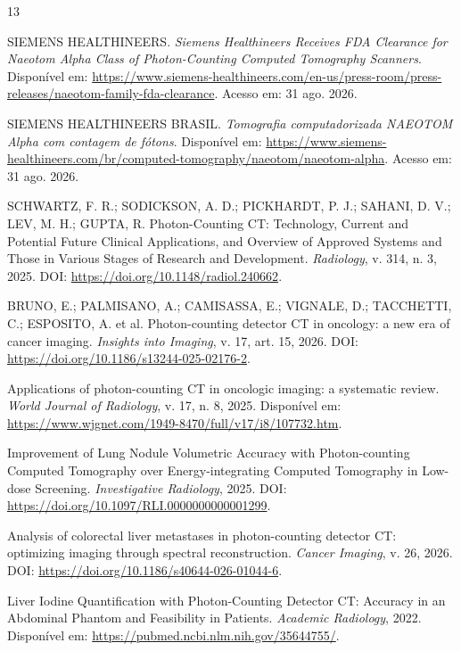 \documentclass[11pt,a4paper]{article}
\begin{document}
\begin{thebibliography}{13}

 SIEMENS HEALTHINEERS. \emph{Siemens Healthineers Receives FDA Clearance for Naeotom Alpha Class of Photon-Counting Computed Tomography Scanners}. Disponível em: \url{https://www.siemens-healthineers.com/en-us/press-room/press-releases/naeotom-family-fda-clearance}. Acesso em: 31 ago. 2026.

 SIEMENS HEALTHINEERS BRASIL. \emph{Tomografia computadorizada NAEOTOM Alpha com contagem de fótons}. Disponível em: \url{https://www.siemens-healthineers.com/br/computed-tomography/naeotom/naeotom-alpha}. Acesso em: 31 ago. 2026.

 SCHWARTZ, F. R.; SODICKSON, A. D.; PICKHARDT, P. J.; SAHANI, D. V.; LEV, M. H.; GUPTA, R. Photon-Counting CT: Technology, Current and Potential Future Clinical Applications, and Overview of Approved Systems and Those in Various Stages of Research and Development. \emph{Radiology}, v. 314, n. 3, 2025. DOI: \url{https://doi.org/10.1148/radiol.240662}.

 BRUNO, E.; PALMISANO, A.; CAMISASSA, E.; VIGNALE, D.; TACCHETTI, C.; ESPOSITO, A. et al. Photon-counting detector CT in oncology: a new era of cancer imaging. \emph{Insights into Imaging}, v. 17, art. 15, 2026. DOI: \url{https://doi.org/10.1186/s13244-025-02176-2}.

 Applications of photon-counting CT in oncologic imaging: a systematic review. \emph{World Journal of Radiology}, v. 17, n. 8, 2025. Disponível em: \url{https://www.wjgnet.com/1949-8470/full/v17/i8/107732.htm}.

 Improvement of Lung Nodule Volumetric Accuracy with Photon-counting Computed Tomography over Energy-integrating Computed Tomography in Low-dose Screening. \emph{Investigative Radiology}, 2025. DOI: \url{https://doi.org/10.1097/RLI.0000000000001299}.

 Analysis of colorectal liver metastases in photon-counting detector CT: optimizing imaging through spectral reconstruction. \emph{Cancer Imaging}, v. 26, 2026. DOI: \url{https://doi.org/10.1186/s40644-026-01044-6}.

 Liver Iodine Quantification with Photon-Counting Detector CT: Accuracy in an Abdominal Phantom and Feasibility in Patients. \emph{Academic Radiology}, 2022. Disponível em: \url{https://pubmed.ncbi.nlm.nih.gov/35644755/}.


\end{thebibliography}
\end{document}
